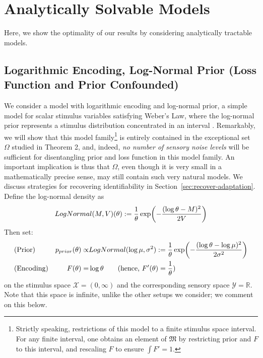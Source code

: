 




\section{Analytically Solvable Models}
Here, we show the optimality of our results by considering analytically tractable models.

\subsection{Logarithmic Encoding, Log-Normal Prior (Loss Function and Prior Confounded)}
We consider a model with logarithmic encoding and log-normal prior, a simple model for scalar stimulus variables satisfying Weber's Law, where the log-normal prior represents a stimulus distribution concentrated in an interval  \cite{Petzschner2011IterativeBE, hahn2024unifying}.
Remarkably, we will show that this model family\footnote{Strictly speaking, restrictions of this model to a finite stimulus space interval. For any finite interval, one obtains an element of $\mathfrak{M}$ by restricting prior and $F$ to this interval, and rescaling $F$ to ensure $\int F' = 1$.} is entirely contained in the exceptional set $\Omega$ studied in Theorem 2, and, indeed, \emph{no number of sensory noise levels} will be sufficient for disentangling prior and loss function in this model family. An important implication is thus that $\Omega$, even though it is very small in a mathematically precise sense, may still contain such very natural models.
We discuss strategies for recovering identifiability in Section~\ref{sec:recover-adaptation}.
Define the log-normal density as
\begin{equation}
LogNormal(M, V)(\theta) := \frac{1}{\theta} \exp(-\frac{(\log \theta - M)^2}{2V}) \\
\end{equation}
Then set:
\begin{align*}
&\text{(Prior) } & \Prior(\theta) \propto& LogNormal(\log\mu, \sigma^2) := \frac{1}{\theta} \exp(-\frac{(\log \theta - \log \mu)^2}{2\sigma^2}) \\
&\text{(Encoding)} & F(\theta) = & \log \theta  \text{\ \ \ \ \ \  (hence, } F'(\theta) = \frac{1}{\theta}\text{)}
\end{align*}
on the stimulus space $\mathcal{X} = (0,\infty)$ and the corresponding sensory space $\mathcal{Y} = \mathbb{R}$.
Note that this space is infinite, unlike the other setups we consider; we comment on this below.
